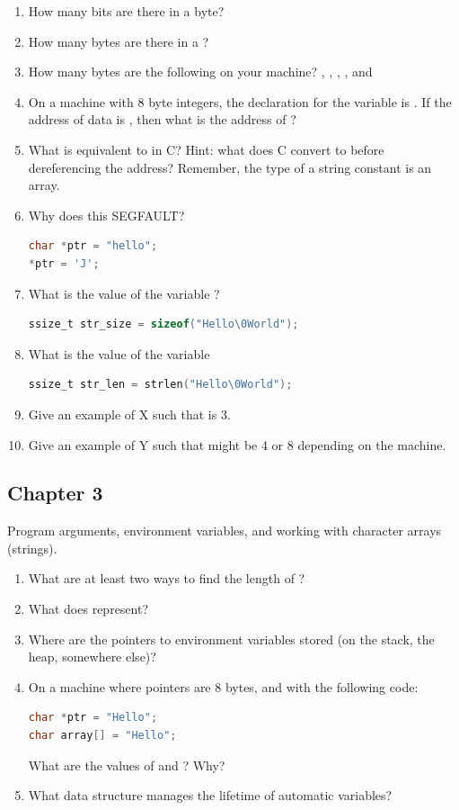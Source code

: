 \begin{enumerate}
\item How many bits are there in a byte?
\item How many bytes are there in a ?
\item How many bytes are the following on your machine? , , , , and 
\item On a machine with 8 byte integers, the declaration for the variable  is .
If the address of data is , then what is the address of ?
\item What is  equivalent to in C? Hint: what does C convert  to before dereferencing the address?
Remember, the type of a string constant  is an array.
\item Why does this SEGFAULT?
\begin{lstlisting}[language=C]
char *ptr = "hello";
*ptr = 'J';
\end{lstlisting}

\item What is the value of the variable ?
\begin{lstlisting}[language=C]
ssize_t str_size = sizeof("Hello\0World");
\end{lstlisting}
\item What is the value of the variable 
\begin{lstlisting}[language=C]
ssize_t str_len = strlen("Hello\0World");
\end{lstlisting}
\item Give an example of X such that  is 3.
\item Give an example of Y such that  might be 4 or 8 depending on the machine.
\end{enumerate}

\subsection{Chapter 3}

Program arguments, environment variables, and working with character arrays (strings).

\begin{enumerate}
\item What are at least two ways to find the length of ?
\item What does  represent?
\item Where are the pointers to environment variables stored (on the stack, the heap, somewhere else)?
\item On a machine where pointers are 8 bytes, and with the following code:
\begin{lstlisting}[language=C]
char *ptr = "Hello";
char array[] = "Hello";
\end{lstlisting}
What are the values of  and ? Why?
\item What data structure manages the lifetime of automatic variables?
\end{enumerate}

